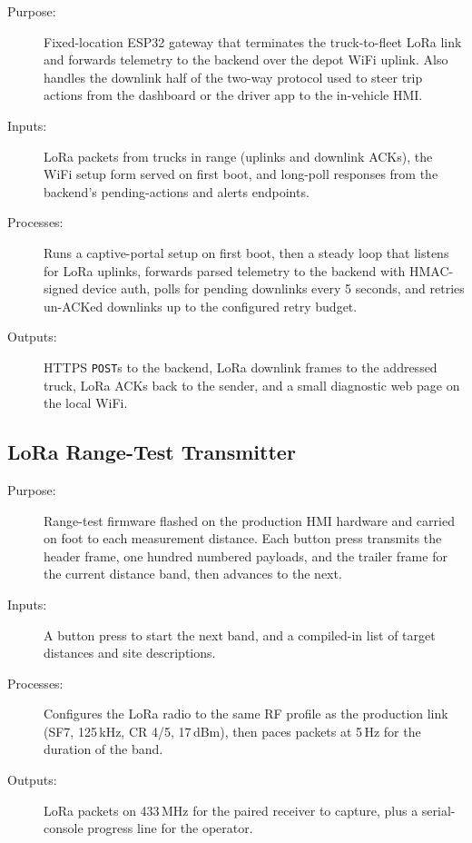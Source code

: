 \begin{description}
\item[Purpose:] Fixed-location ESP32 gateway that terminates the truck-to-fleet LoRa link and forwards telemetry to the backend over the depot WiFi uplink. Also handles the downlink half of the two-way protocol used to steer trip actions from the dashboard or the driver app to the in-vehicle HMI.
\item[Inputs:] LoRa packets from trucks in range (uplinks and downlink ACKs), the WiFi setup form served on first boot, and long-poll responses from the backend's pending-actions and alerts endpoints.
\item[Processes:] Runs a captive-portal setup on first boot, then a steady loop that listens for LoRa uplinks, forwards parsed telemetry to the backend with HMAC-signed device auth, polls for pending downlinks every 5 seconds, and retries un-ACKed downlinks up to the configured retry budget.
\item[Outputs:] HTTPS \texttt{POST}s to the backend, LoRa downlink frames to the addressed truck, LoRa ACKs back to the sender, and a small diagnostic web page on the local WiFi.
\end{description}




\subsection{LoRa Range-Test Transmitter}
\label{sec:code_lora_tx}

\begin{description}
\item[Purpose:] Range-test firmware flashed on the production HMI hardware and carried on foot to each measurement distance. Each button press transmits the header frame, one hundred numbered payloads, and the trailer frame for the current distance band, then advances to the next.
\item[Inputs:] A button press to start the next band, and a compiled-in list of target distances and site descriptions.
\item[Processes:] Configures the LoRa radio to the same RF profile as the production link (SF7, 125\,kHz, CR 4/5, 17\,dBm), then paces packets at 5\,Hz for the duration of the band.
\item[Outputs:] LoRa packets on 433\,MHz for the paired receiver to capture, plus a serial-console progress line for the operator.
\end{description}

